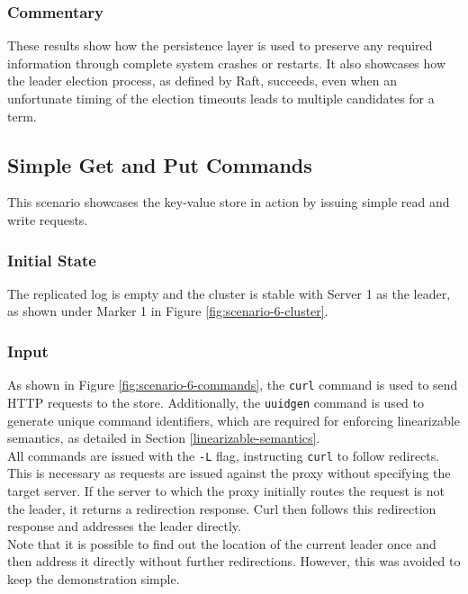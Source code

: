 \subsubsection{Commentary}

These results show how the persistence layer is used to preserve any required information through complete system crashes or restarts. It also showcases how the leader election process, as defined by Raft, succeeds, even when an unfortunate timing of the election timeouts leads to multiple candidates for a term.

\subsection{Simple Get and Put Commands} \label{simple-get-put-scenario} \label{L-flag}

This scenario showcases the key-value store in action by issuing simple read and write requests.

\subsubsection{Initial State}

The replicated log is empty and the cluster is stable with Server 1 as the leader, as shown under Marker 1 in Figure \ref{fig:scenario-6-cluster}.

\subsubsection{Input}

As shown in Figure \ref{fig:scenario-6-commands}, the \lstinline|curl| command is used to send HTTP requests to the store. Additionally, the \lstinline|uuidgen| command is used to generate unique command identifiers, which are required for enforcing linearizable semantics, as detailed in Section \ref{linearizable-semantics}.\\

All commands are issued with the \lstinline|-L| flag, instructing \lstinline|curl| to follow redirects. This is necessary as requests are issued against the proxy without specifying the target server. If the server to which the proxy initially routes the request is not the leader, it returns a redirection response. Curl then follows this redirection response and addresses the leader directly.\\

Note that it is possible to find out the location of the current leader once and then address it directly without further redirections. However, this was avoided to keep the demonstration simple.

